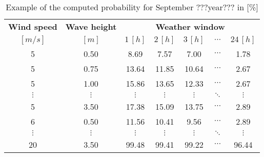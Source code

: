 \begin{table}
\label{tab:proba}
\begin{tabular}{ccccccc}
\hline
{\bf Wind speed} & {\bf Wave height} & \multicolumn{ 5}{c}{{\bf Weather window}} \\
$[m/s]$      &      $[m]$      &          $1\, [h]$ &          $2\, [h]$ &          $3\, [h]$ &  $\cdots$ &         $24\, [h]$ \\
\hline
5 &       0.50 &       8.69 &       7.57 &       7.00 &  $\cdots$ &       1.78 \\
5 &       0.75 &      13.64 &      11.85 &      10.64 &  $\cdots$ &       2.67 \\
5 &       1.00 &      15.86 &      13.65 &      12.33 &  $\cdots$ &       2.67 \\
 $\vdots$ &  $\vdots$ &  $\vdots$ &  $\vdots$ &  $\vdots$ &  $\ddots$ &  $\vdots$ \\
5 &       3.50 &      17.38 &      15.09 &      13.75 &  $\cdots$ &       2.89 \\
6 &       0.50 &      11.56 &      10.41 &       9.56 &  $\cdots$ &       2.89 \\
 $\vdots$ &  $\vdots$ &  $\vdots$ &  $\vdots$ &  $\vdots$ & $\ddots$           &  $\vdots$ \\
20 &       3.50 &      99.48 &      99.41 &      99.22 &  $\cdots$ &      96.44 \\
\hline
\end{tabular}  

\caption{Example of the computed probability for September ???year??? in [\%]}
\end{table}